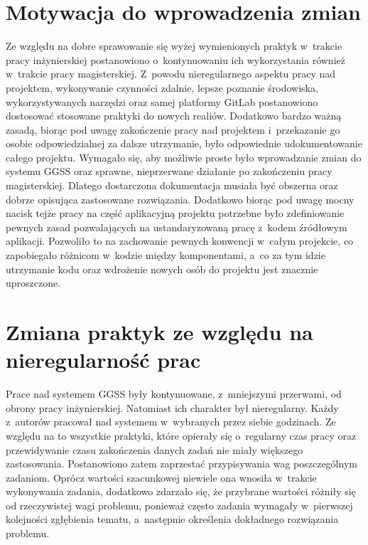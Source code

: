 \section{Motywacja do wprowadzenia zmian}
Ze względu na dobre sprawowanie się wyżej wymienionych praktyk w~trakcie pracy inżynierskiej postanowiono o~kontynuowaniu ich wykorzystania również w~trakcie pracy magisterskiej. Z~powodu nieregularnego aspektu pracy nad projektem, wykonywanie czynności zdalnie, lepsze poznanie środowiska, wykorzystywanych narzędzi oraz samej platformy GitLab postanowiono dostosować stosowane praktyki do nowych realiów. Dodatkowo bardzo ważną zasadą, biorąc pod uwagę zakończenie pracy nad projektem i~przekazanie go osobie odpowiedzialnej za dalsze utrzymanie, było odpowiednie udokumentowanie całego projektu. Wymagało się, aby możliwie proste było wprowadzanie zmian do systemu GGSS oraz sprawne, nieprzerwane działanie po zakończeniu pracy magisterskiej. Dlatego dostarczona dokumentacja musiała być obszerna oraz dobrze opisująca zastosowane rozwiązania. Dodatkowo biorąc pod uwagę mocny nacisk tejże pracy na część aplikacyjną projektu potrzebne było zdefiniowanie pewnych zasad pozwalających na ustandaryzowaną pracę z~kodem źródłowym aplikacji. Pozwoliło to na zachowanie pewnych konwencji w~całym projekcie, co zapobiegało różnicom w~kodzie między komponentami, a~co za tym idzie utrzymanie kodu oraz wdrożenie nowych osób do projektu jest znacznie uproszczone.


\section{Zmiana praktyk ze względu na nieregularność prac}

Prace nad systemem GGSS były kontynuowane, z~mniejszymi przerwami, od obrony pracy inżynierskiej. Natomiast ich charakter był nieregularny. Każdy z~autorów pracował nad systemem w~wybranych przez siebie godzinach. Ze względu na to wszystkie praktyki, które opierały się o~regularny czas pracy oraz przewidywanie czasu zakończenia danych zadań nie miały większego zastosowania. Postanowiono zatem zaprzestać przypisywania wag poszczególnym zadaniom. Oprócz wartości szacunkowej niewiele ona wnosiła w~trakcie wykonywania zadania, dodatkowo zdarzało się, że przybrane wartości różniły się od rzeczywistej wagi problemu, ponieważ często zadania wymagały w~pierwszej kolejności zgłębienia tematu, a~następnie określenia dokładnego rozwiązania problemu.

